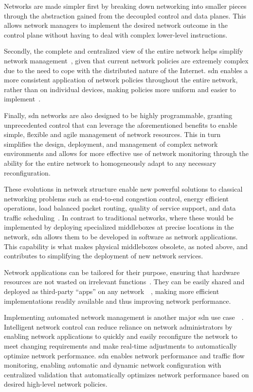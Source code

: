 Networks are made simpler first by breaking down networking into smaller pieces through the abstraction gained from the decoupled control and data planes. This allows network managers to implement the desired network outcome in the control plane without having to deal with complex lower-level instructions.

Secondly, the complete and centralized view of the entire network helps simplify network management~\cite{bifulco_survey_2018}, given that current network policies are extremely complex due to the need to cope with the distributed nature of the Internet. \gls{sdn} enables a more consistent application of network policies throughout the entire network, rather than on individual devices, making policies more uniform and easier to implement~\cite{nunes_survey_2014}.   

Finally, \gls{sdn} networks are also designed to be highly programmable, granting unprecedented control that can leverage the aforementioned benefits to enable simple, flexible and agile management of network resources. This in turn simplifies the design, deployment, and management of complex network environments and allows for more effective use of network monitoring through the ability for the entire network to homogeneously adapt to any necessary reconfiguration.

These evolutions in network structure enable new powerful solutions to classical networking problems such as end-to-end congestion control, energy efficient operations, load balanced packet routing, quality of service support, and data traffic scheduling~\cite{xia_survey_2015}. In contrast to traditional networks, where these would be implemented by deploying specialized middleboxes at precise locations in the network, \gls{sdn} allows them to be developed in software as network applications. This capability is what makes physical middleboxes obsolete, as noted above, and contributes to simplifying the deployment of new network services.

Network applications can be tailored for their purpose, ensuring that hardware resources are not wasted on irrelevant functions~\cite{bifulco_survey_2018}. They can be easily shared and deployed as third-party “apps” on any network~\cite{nunes_survey_2014}~\cite{kreutz_software-defined_2015}, making more efficient implementations readily available and thus improving network performance. 

Implementing automated network management is another major \gls{sdn} use case~\cite{xia_survey_2015}~\cite{li_protocol_2017}. Intelligent network control can reduce reliance on network administrators by enabling network applications to quickly and easily reconfigure the network to meet changing requirements and make real-time adjustments to automatically optimize network performance. \gls{sdn} enables network performance and traffic flow monitoring, enabling automatic and dynamic network configuration with centralized validation that automatically optimizes network performance based on desired high-level network policies. 

